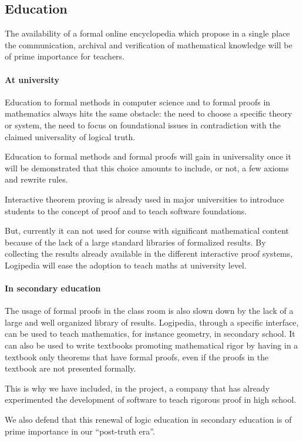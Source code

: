 \subsection{Education}

The availability of a formal online encyclopedia which propose in a
single place the communication, archival and verification of
mathematical knowledge will be of prime importance for teachers.


\paragraph*{At university}
Education to formal methods in computer science and to formal proofs
in mathematics always hits the same obstacle: the need to choose a
specific theory or system, the need to focus on foundational issues in
contradiction with the claimed universality of logical truth.

Education to formal methods and formal proofs will gain in
universality once it will be demonstrated that this choice amounts to
include, or not, a few axioms and rewrite rules.  

Interactive theorem proving is already used in major universities to 
introduce students to the concept of proof and to teach software foundations.

But, currently it can not used for course with significant mathematical content 
because of the lack of a large standard libraries of formalized results.
By collecting the results already available in the different interactive proof systems,
Logipedia will ease the adoption to teach maths at university level.

\paragraph*{In secondary education}
The usage of formal proofs in the class room is also slown down by the
lack of a large and well organized library of results.  Logipedia,
through a specific interface, can be used to teach mathematics, for
instance geometry, in secondary school.  It can also be used to write
textbooks promoting mathematical rigor by having in a textbook only
theorems that have formal proofs, even if the proofs in the textbook
are not presented formally. 

This is why we have included, in the project, a company that has 
already experimented the development of software to teach rigorous proof
in high school. 

We also defend that this renewal of logic education in secondary education
is of prime importance in our ``post-truth era''.

